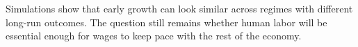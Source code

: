 Simulations show that early growth can look similar across regimes with different long-run outcomes. The question still remains whether human labor will be essential enough for wages to keep pace with the rest of the economy.








